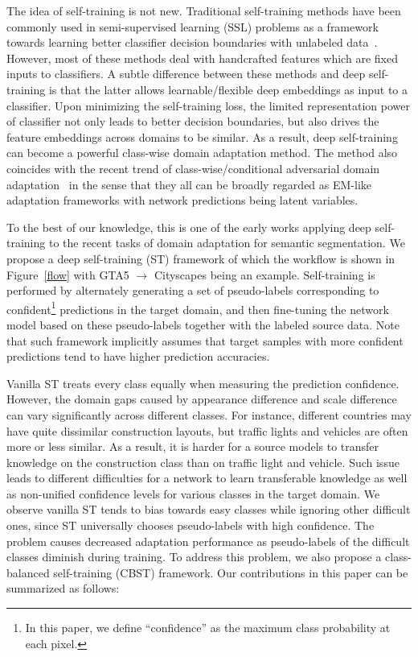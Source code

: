 \documentclass[runningheads]{llncs}
\begin{document}
The idea of self-training is not new. Traditional self-training methods have been commonly used in semi-supervised learning (SSL) problems as a framework towards learning better classifier decision boundaries with unlabeled data~\cite{grandvalet2005semi}. However, most of these methods deal with handcrafted features which are fixed inputs to classifiers. A subtle difference between these methods and deep self-training is that the latter allows learnable/flexible deep embeddings as input to a classifier. Upon minimizing the self-training loss, the limited representation power of classifier not only leads to better decision boundaries, but also drives the feature embeddings across domains to be similar. As a result, deep self-training can become a powerful class-wise domain adaptation method. The method also coincides with the recent trend of class-wise/conditional adversarial domain adaptation~\cite{Chen_2017_ICCV} in the sense that they all can be broadly regarded as EM-like adaptation frameworks with network predictions being latent variables.

To the best of our knowledge, this is one of the early works applying deep self-training to the recent tasks of domain adaptation for semantic segmentation. We propose a deep self-training (ST) framework of which the workflow is shown in Figure~\ref{flow} with GTA5 $\rightarrow$ Cityscapes being an example. Self-training is performed by alternately generating a set of pseudo-labels corresponding to confident\footnote{In this paper, we define ``confidence'' as the maximum class probability at each pixel.} predictions in the target domain, and then fine-tuning the network model based on these pseudo-labels together with the labeled source data. Note that such framework implicitly assumes that target samples with more confident predictions tend to have higher prediction accuracies.

Vanilla ST treats every class equally when measuring the prediction confidence. However, the domain gaps caused by appearance difference and scale difference can vary significantly across different classes. For instance, different countries may have quite dissimilar construction layouts, but traffic lights and vehicles are often more or less similar. As a result, it is harder for a source models to transfer knowledge on the construction class than on traffic light and vehicle. Such issue leads to different difficulties for a network to learn transferable knowledge as well as non-unified confidence levels for various classes in the target domain. We observe vanilla ST tends to bias towards easy classes while ignoring other difficult ones, since ST universally chooses pseudo-labels with high confidence. The problem causes decreased adaptation performance as pseudo-labels of the difficult classes diminish during training. To address this problem, we also propose a class-balanced self-training (CBST) framework. Our contributions in this paper can be summarized as follows:
\end{document}
